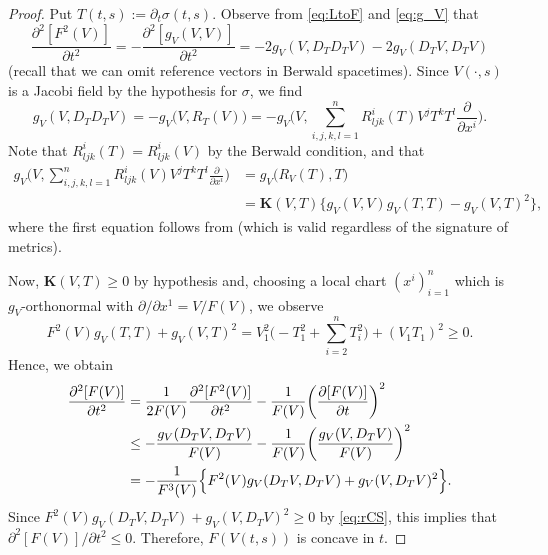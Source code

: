 \documentclass[a4paper,11pt]{article}
\numberwithin{equation}{section}
\theoremstyle{definition}
\theoremstyle{plain}
\newcommand{\del}{\partial}
\newcommand{\bK}{\mathbf{K}}
\begin{document}
\begin{proof}
Put $T(t,s):=\del_t \sigma(t,s)$.
Observe from \eqref{eq:LtoF} and \eqref{eq:g_V} that
\[ \frac{\del^2 [F^2(V)]}{\del t^2} =-\frac{\del^2 [g_V(V,V)]}{\del t^2}
 =-2g_V (V,D_T D_T V) -2g_V(D_T V,D_T V) \]
(recall that we can omit reference vectors in Berwald spacetimes).
Since $V(\cdot,s)$ is a Jacobi field by the hypothesis for $\sigma$, we find
\begin{equation}\label{eq:secondVariationDD}
g_V(V,D_T D_T V) =-g_V \bigl( V,R_T(V) \bigr)
 =-g_V \Biggl( V,\sum_{i,j,k,l=1}^n R^i_{ljk}(T) V^j T^k T^l \frac{\del}{\del x^i} \Biggr). 
\end{equation}
Note that $R^i_{ljk}(T)=R^i_{ljk}(V)$ by the Berwald condition, and that
\begin{equation}\label{eq:secondVariationK}
\begin{split}
g_V\Biggl( V,\sum_{i,j,k,l=1}^n R^i_{ljk}(V) V^j T^k T^l \frac{\del}{\del x^i} \Biggr)
&= g_V\bigl( R_V(T),T \bigr) \\
&= \bK(V,T) \bigl\{ g_V(V,V) g_V(T,T) -g_V(V,T)^2 \bigr\},
\end{split}
\end{equation}
where the first equation follows from \cite[Lemma~5.15(iv)]{Obook} (which is valid regardless of the signature of metrics).

Now, $\bK(V,T) \ge 0$ by hypothesis and, 
choosing a local chart $(x^i)_{i=1}^n$ which is $g_V$-orthonormal with $\del/\del x^1=V/F(V)$, we observe
\begin{equation}\label{eq:rCS}
F^2(V) g_V(T,T) +g_V(V,T)^2
 =V_1^2 \Biggl( -T_1^2 +\sum_{i=2}^n T_i^2 \Biggr) +(V_1 T_1)^2 \ge 0.
\end{equation}
Hence, we obtain
\begin{equation}
\begin{split}\label{eq:secondVariationFirstStep}
\frac{\del^2 [F(V)]}{\del t^2}
& = \frac{1}{2F(V)} \frac{\del^2 [F^2(V)]}{\del t^2}
 -\frac{1}{F(V)} \biggl( \frac{\del [F(V)]}{\del t} \biggr)^2 \\
& \le  -\frac{g_V(D_T V,D_T V)}{F(V)}
 -\frac{1}{F(V)} \biggl( \frac{g_V(V,D_T V)}{F(V)} \biggr)^2 \\
& = - \frac{1}{F^3(V)}
 \Bigl\{ F^2(V) g_V(D_T V,D_T V) +g_V(V,D_T V)^2 \Bigr\}.
\end{split}
\end{equation}
Since $F^2(V) g_V(D_T V,D_T V) +g_V(V,D_T V)^2 \ge 0$ by \eqref{eq:rCS}, this implies that $\partial^2[F(V)]/\partial t^2 \le 0$.
Therefore, $F(V(t,s))$ is concave in $t$.
\end{proof}
\end{document}
